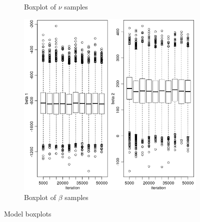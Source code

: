 \documentclass[11pt,twoside]{report}
\begin{document}
\begin{figure}[H]
\begin{subfigure}[H]{0.50\linewidth}
	\caption{Boxplot of $ \nu $ samples}
	\label{fig:M2_s3}
\end{subfigure}
\hfill
\begin{subfigure}[H]{0.50\linewidth}
	\centering
	\includegraphics[width=70 mm]{pictures/m2_s4.png}
	\caption{Boxplot of $ \beta $ samples}
	\label{fig:M2_s4}
\end{subfigure}%
	\caption{Model boxplots}
\end{figure}
\end{document}
